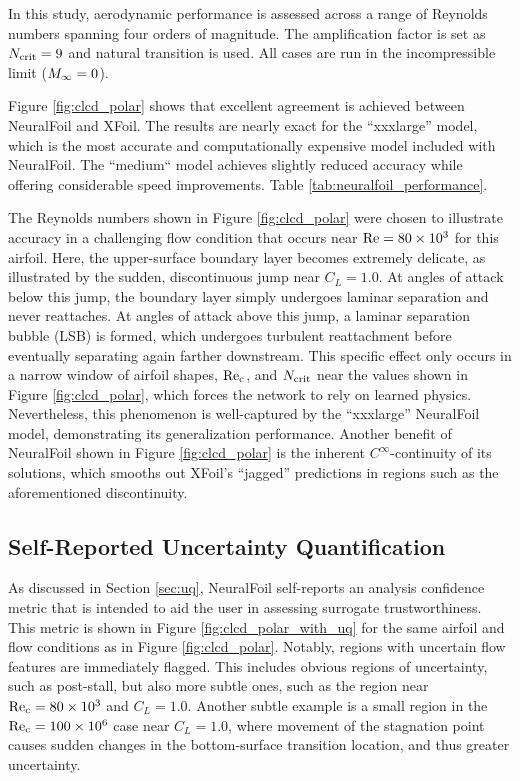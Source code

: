 \documentclass[journal]{new-aiaa}
\begin{document}
In this study, aerodynamic performance is assessed across a range of Reynolds numbers spanning four orders of magnitude. The amplification factor is set as $N_{\rm crit}=9$ and natural transition is used. All cases are run in the incompressible limit ($M_\infty=0$).

Figure \ref{fig:clcd_polar} shows that excellent agreement is achieved between NeuralFoil and XFoil. The results are nearly exact for the ``xxxlarge'' model, which is the most accurate and computationally expensive model included with NeuralFoil. The ``medium`` model achieves slightly reduced accuracy while offering considerable speed improvements. Table \ref{tab:neuralfoil_performance}.

The Reynolds numbers shown in Figure \ref{fig:clcd_polar} were chosen to illustrate accuracy in a challenging flow condition that occurs near $\rm Re=80 \times 10^3$ for this airfoil. Here, the upper-surface boundary layer becomes extremely delicate, as illustrated by the sudden, discontinuous jump near $C_L=1.0$. At angles of attack below this jump, the boundary layer simply undergoes laminar separation and never reattaches. At angles of attack above this jump, a laminar separation bubble (LSB) is formed, which undergoes turbulent reattachment before eventually separating again farther downstream. This specific effect only occurs in a narrow window of airfoil shapes, $\rm Re_c$, and $N_{\rm crit}$ near the values shown in Figure \ref{fig:clcd_polar}, which forces the network to rely on learned physics. Nevertheless, this phenomenon is well-captured by the ``xxxlarge'' NeuralFoil model, demonstrating its generalization performance. Another benefit of NeuralFoil shown in Figure \ref{fig:clcd_polar} is the inherent $C^\infty$-continuity of its solutions, which smooths out XFoil's ``jagged'' predictions in regions such as the aforementioned discontinuity.

\subsection{Self-Reported Uncertainty Quantification}
\label{sec:uq_results}

As discussed in Section \ref{sec:uq}, NeuralFoil self-reports an analysis confidence metric that is intended to aid the user in assessing surrogate trustworthiness. This metric is shown in Figure \ref{fig:clcd_polar_with_uq} for the same airfoil and flow conditions as in Figure \ref{fig:clcd_polar}. Notably, regions with uncertain flow features are immediately flagged. This includes obvious regions of uncertainty, such as post-stall, but also more subtle ones, such as the region near $\rm Re_c=80 \times 10^3$ and $C_L=1.0$. Another subtle example is a small region in the $\rm Re_c=100 \times 10^6$ case near $C_L=1.0$, where movement of the stagnation point causes sudden changes in the bottom-surface transition location, and thus greater uncertainty.
\end{document}
